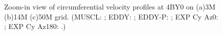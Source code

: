 \begin{figure}[t]
     \caption{Zoom-in view of circumferential velocity profiles at 4BY0 on (a)3M (b)14M (c)50M grid. (MUSCL: \mline; EDDY: \eline; EDDY-P: \epline; EXP Cy Az0: \bluecrx; EXP Cy Az180: \redcrx.)}
     \label{zv} 
\end{figure}
